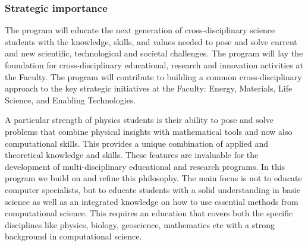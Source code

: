 \documentclass{beamer}
\begin{document}
\begin{frame}
\frametitle{Strategic importance}

The program will educate the next generation of cross-disciplinary
science students with the knowledge, skills, and values needed to pose
and solve current and new scientific, technological and societal
challenges. The program will lay the foundation for cross-disciplinary
educational, research and innovation activities at the Faculty. The
program will contribute to building a common cross-disciplinary
approach to the key strategic initiatives at the Faculty: Energy,
Materials, Life Science, and Enabling Technologies.

A particular strength of physics students is their ability to pose and
solve problems that combine physical insights with mathematical tools
and now also computational skills. This provides a unique combination
of applied and theoretical knowledge and skills. These features are invaluable 
for the development of multi-disciplinary educational and research programs. 
In this program we build on and
refine this philosophy.  The main focus is not to educate computer
specialists, but to educate students with a solid understanding in basic science
as well as an integrated knowledge on how  to use 
essential methods from computational science. This requires an
education that covers both the specific disciplines like physics, biology,
geoscience, mathematics etc with a strong background in computational science.
\end{frame}
\end{document}
